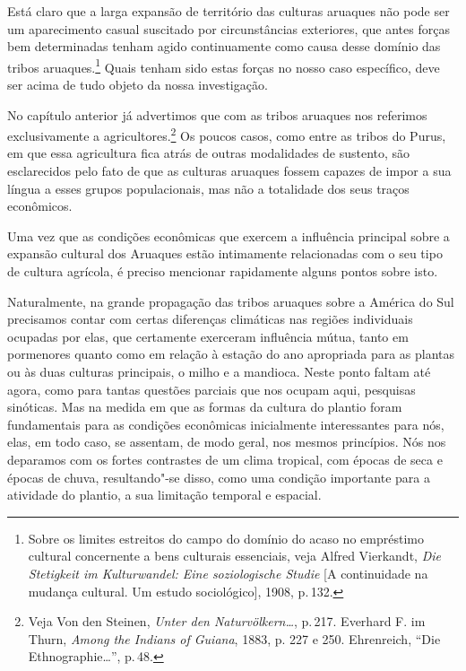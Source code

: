 Está claro que a larga expansão de território das culturas aruaques não
pode ser um aparecimento casual suscitado por circunstâncias exteriores,
que antes forças bem determinadas tenham agido continuamente como causa
desse domínio das tribos aruaques.\footnote{Sobre os limites estreitos do
  campo do domínio do acaso no empréstimo cultural concernente a bens
  culturais essenciais, veja Alfred Vierkandt, \textit{Die Stetigkeit im
  Kulturwandel: Eine soziologische Studie} {[}A continuidade na mudança
  cultural. Um estudo sociológico{]}, 1908, p.\,132.} Quais tenham sido
estas forças no nosso caso específico, deve ser acima de tudo objeto da
nossa investigação.

No capítulo anterior já advertimos que com as tribos aruaques nos
referimos exclusivamente a agricultores.\footnote{Veja Von den Steinen,
  \textit{Unter den Naturvölkern\ldots}, p.\,217.
  Everhard F. im Thurn, \textit{Among the Indians of Guiana}, 1883, p.
  227 e 250. Ehrenreich, ``Die Ethnographie\ldots'', p.\,48.} Os poucos casos, como entre as tribos do
Purus, em que essa agricultura fica atrás de outras modalidades de
sustento, são esclarecidos pelo fato de que as culturas aruaques fossem
capazes de impor a sua língua a esses grupos populacionais, mas não a
totalidade dos seus traços econômicos.

Uma vez que as condições econômicas que exercem a influência principal
sobre a expansão cultural dos Aruaques estão intimamente relacionadas com
o seu tipo de cultura agrícola, é preciso mencionar rapidamente alguns pontos sobre isto.

Naturalmente, na grande propagação das tribos aruaques sobre a América do
Sul precisamos contar com certas diferenças climáticas nas regiões
individuais ocupadas por elas, que certamente exerceram influência
mútua, tanto em pormenores quanto como em relação à estação do ano
apropriada para as plantas ou às duas culturas principais, o
milho e a mandioca. Neste ponto faltam até agora, como para tantas
questões parciais que nos ocupam aqui, pesquisas sinóticas. Mas na
medida em que as formas da cultura do plantio foram fundamentais para as
condições econômicas inicialmente interessantes para nós, elas, em todo
caso, se assentam, de modo geral, nos mesmos princípios. Nós nos
deparamos com os fortes contrastes de um clima tropical, com épocas de
seca e épocas de chuva, resultando"-se disso, como uma condição
importante para a atividade do plantio, a sua limitação temporal e
espacial.

